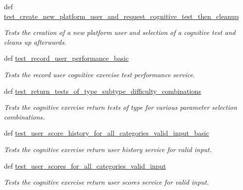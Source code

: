 \begin{DoxyCompactItemize}
def \hyperlink{classcognitive__exercise__system__services__functional__tests_1_1CognitiveExerciseFunc_a71da9457f5b15cabb087834485f254fd}{test\-\_\-create\-\_\-new\-\_\-platform\-\_\-user\-\_\-and\-\_\-request\-\_\-cognitive\-\_\-test\-\_\-then\-\_\-cleanup}
\begin{DoxyCompactList}\small\item\em Tests the creation of a new platform user and selection of a cognitive test and cleans up afterwards. \end{DoxyCompactList}\item 
def \hyperlink{classcognitive__exercise__system__services__functional__tests_1_1CognitiveExerciseFunc_a3acf48c7deadcfd227fd3378b03e81d5}{test\-\_\-record\-\_\-user\-\_\-performance\-\_\-basic}
\begin{DoxyCompactList}\small\item\em Tests the record user cognitive exercise test performance service. \end{DoxyCompactList}\item 
def \hyperlink{classcognitive__exercise__system__services__functional__tests_1_1CognitiveExerciseFunc_a716529fe497bf92c44ecef813aba3b26}{test\-\_\-return\-\_\-tests\-\_\-of\-\_\-type\-\_\-subtype\-\_\-difficulty\-\_\-combinations}
\begin{DoxyCompactList}\small\item\em Tests the cognitive exercise return tests of type for various parameter selection combinations. \end{DoxyCompactList}\item 
def \hyperlink{classcognitive__exercise__system__services__functional__tests_1_1CognitiveExerciseFunc_ae9ca557321fe89707bcd4128e8cfaaab}{test\-\_\-user\-\_\-score\-\_\-history\-\_\-for\-\_\-all\-\_\-categories\-\_\-valid\-\_\-input\-\_\-basic}
\begin{DoxyCompactList}\small\item\em Tests the cognitive exercise return user history service for valid input. \end{DoxyCompactList}\item 
def \hyperlink{classcognitive__exercise__system__services__functional__tests_1_1CognitiveExerciseFunc_a3a454d844952d18721f648d2713c18c4}{test\-\_\-user\-\_\-scores\-\_\-for\-\_\-all\-\_\-categories\-\_\-valid\-\_\-input}
\begin{DoxyCompactList}\small\item\em Tests the cognitive exercise return user scores service for valid input. \end{DoxyCompactList}\end{DoxyCompactItemize}



